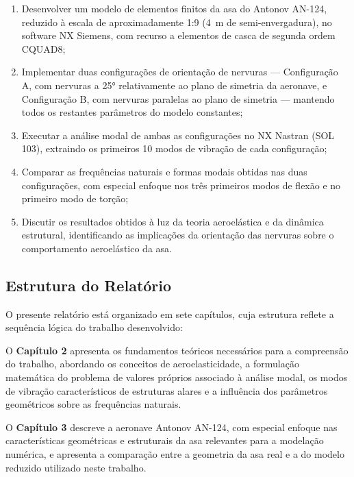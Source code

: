 \documentclass[a4paper,fleqn,noprintline]{cas-dc}
\begin{document}
\begin{enumerate}
    \item Desenvolver um modelo de elementos finitos da asa do Antonov AN-124, reduzido à escala de aproximadamente 1:9 (\SI{4}{\meter} de semi-envergadura), no software NX Siemens, com recurso a elementos de casca de segunda ordem CQUAD8;

    \item Implementar duas configurações de orientação de nervuras --- Configuração A, com nervuras a 25° relativamente ao plano de simetria da aeronave, e Configuração B, com nervuras paralelas ao plano de simetria --- mantendo todos os restantes parâmetros do modelo constantes;

    \item Executar a análise modal de ambas as configurações no NX Nastran (SOL 103), extraindo os primeiros 10 modos de vibração de cada configuração;

    \item Comparar as frequências naturais e formas modais obtidas nas duas configurações, com especial enfoque nos três primeiros modos de flexão e no primeiro modo de torção;

    \item Discutir os resultados obtidos à luz da teoria aeroelástica e da dinâmica estrutural, identificando as implicações da orientação das nervuras sobre o comportamento aeroelástico da asa.
\end{enumerate}

\subsection{Estrutura do Relatório}

O presente relatório está organizado em sete capítulos, cuja estrutura reflete a sequência lógica do trabalho desenvolvido:

O \textbf{Capítulo 2} apresenta os fundamentos teóricos necessários para a compreensão do trabalho, abordando os conceitos de aeroelasticidade, a formulação matemática do problema de valores próprios associado à análise modal, os modos de vibração característicos de estruturas alares e a influência dos parâmetros geométricos sobre as frequências naturais.

O \textbf{Capítulo 3} descreve a aeronave Antonov AN-124, com especial enfoque nas características geométricas e estruturais da asa relevantes para a modelação numérica, e apresenta a comparação entre a geometria da asa real e a do modelo reduzido utilizado neste trabalho.
\end{document}
